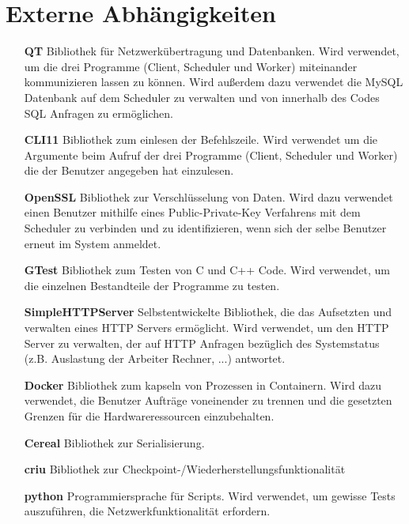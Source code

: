 \documentclass[a4paper,12pt]{article}
\begin{document}
\clearpage
\section{Externe Abhängigkeiten}
\begin{itemize}
	\item [\textbf{QT}] \hspace{10mm} Bibliothek für Netzwerkübertragung und Datenbanken. Wird verwendet, um die drei Programme (Client, Scheduler und Worker) miteinander kommunizieren lassen zu können. Wird außerdem dazu verwendet die MySQL Datenbank auf dem Scheduler zu verwalten und von innerhalb des Codes SQL Anfragen zu ermöglichen.

	\item [\textbf{CLI11}]\hspace{10mm} Bibliothek zum einlesen der Befehlszeile. Wird verwendet um die Argumente beim Aufruf der drei Programme (Client, Scheduler und Worker) die der Benutzer angegeben hat einzulesen.

	\item [\textbf{OpenSSL}] \hspace{10mm} Bibliothek zur Verschlüsselung von Daten. Wird dazu verwendet einen Benutzer mithilfe eines Public-Private-Key Verfahrens mit dem Scheduler zu verbinden und zu identifizieren, wenn sich der selbe Benutzer erneut im System anmeldet.

	\item [\textbf{GTest}] \hspace{0.5cm} Bibliothek zum Testen von C und C++ Code. Wird verwendet, um die einzelnen Bestandteile der Programme zu testen.

	\item [\textbf{SimpleHTTPServer}] \hspace{3cm} Selbstentwickelte Bibliothek, die das Aufsetzten und verwalten eines HTTP Servers ermöglicht. Wird verwendet, um den HTTP Server zu verwalten, der auf HTTP Anfragen bezüglich des Systemstatus (z.B. Auslastung der Arbeiter Rechner, ...) antwortet.

	\item [\textbf{Docker}]\hspace{10mm} Bibliothek zum kapseln von Prozessen in Containern. Wird dazu verwendet, die Benutzer Aufträge voneinender zu trennen und die gesetzten Grenzen für die Hardwareressourcen einzubehalten.

	\item [\textbf{Cereal}]\hspace{1cm} Bibliothek zur Serialisierung.

	\item [\textbf{criu}] \hspace{1cm}Bibliothek zur Checkpoint-/Wiederherstellungsfunktionalität 

	\item [\textbf{python}]\hspace{1cm} Programmiersprache für Scripts. Wird verwendet, um gewisse Tests auszuführen, die Netzwerkfunktionalität erfordern.

\end{itemize}
\end{document}

